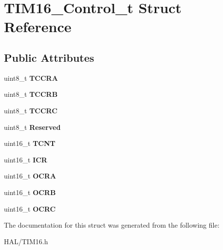 \hypertarget{struct_t_i_m16___control__t}{}\section{T\+I\+M16\+\_\+\+Control\+\_\+t Struct Reference}
\label{struct_t_i_m16___control__t}
\subsection*{Public Attributes}
\begin{DoxyCompactItemize}
\item 
\mbox{\label{struct_t_i_m16___control__t_a2d530a6ae49280e711e916f36822bcc5}} 
uint8\+\_\+t {\bfseries T\+C\+C\+RA}
\item 
\mbox{\label{struct_t_i_m16___control__t_a46bd36030839689bb48c9b92f9353191}} 
uint8\+\_\+t {\bfseries T\+C\+C\+RB}
\item 
\mbox{\label{struct_t_i_m16___control__t_a19491815ae880bbd7bdd3bb6e0e6c57a}} 
uint8\+\_\+t {\bfseries T\+C\+C\+RC}
\item 
\mbox{\label{struct_t_i_m16___control__t_a9cb16414e8b07f483fd711519d7beaa0}} 
uint8\+\_\+t {\bfseries Reserved}
\item 
\mbox{\label{struct_t_i_m16___control__t_adc5c6a694f605860d53c07f5e79f451e}} 
uint16\+\_\+t {\bfseries T\+C\+NT}
\item 
\mbox{\label{struct_t_i_m16___control__t_a76116bc882860373763315778b3119b1}} 
uint16\+\_\+t {\bfseries I\+CR}
\item 
\mbox{\label{struct_t_i_m16___control__t_a0b7ac7b984ea10d0a6e3c4a64b0cb8ab}} 
uint16\+\_\+t {\bfseries O\+C\+RA}
\item 
\mbox{\label{struct_t_i_m16___control__t_a41baa9656adad2338dc40881bfccab4a}} 
uint16\+\_\+t {\bfseries O\+C\+RB}
\item 
\mbox{\label{struct_t_i_m16___control__t_a8463425e192b0a0cd6d1eba7b6db8f7a}} 
uint16\+\_\+t {\bfseries O\+C\+RC}
\end{DoxyCompactItemize}


The documentation for this struct was generated from the following file\+:\begin{DoxyCompactItemize}
\item 
H\+A\+L/T\+I\+M16.\+h\end{DoxyCompactItemize}
